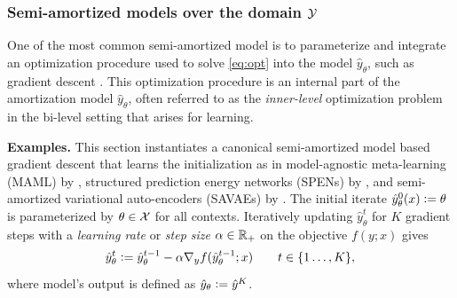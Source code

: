 \subsubsection{Semi-amortized models over the domain ${\mathcal{Y}}$}
\label{sec:semi-domain}
\begin{center}
\end{center}
\vspace{-3mm}

One of the most common semi-amortized model is to
parameterize and integrate an optimization procedure
used to solve \cref{eq:opt} into the model $\hat y_\theta$,
such as gradient descent \citep{andrychowicz2016learning,finn2017model,kim2018semi}.
This optimization procedure is an internal part of
the amortization model $\hat y_\theta$,
often referred to as the \emph{inner-level} optimization
problem in the bi-level setting that arises for learning.

\textbf{Examples.}
This section instantiates a canonical semi-amortized model based
gradient descent that learns the initialization as in
model-agnostic meta-learning (MAML) by \citet{finn2017model},
structured prediction energy networks (SPENs) by \citet{belanger2017end},
and semi-amortized variational auto-encoders (SAVAEs) by \citet{kim2018semi}.
The initial iterate $\hat y^{0}_\theta(x)\vcentcolon= \theta$
is parameterized by $\theta\in{\mathcal{X}}$ for all contexts.
Iteratively updating $\hat y^{t}_\theta$ for $K$ gradient steps
with a \emph{learning rate} or \emph{step size} $\alpha\in\mathbb{R}_+$
on the objective $f(y;x)$ gives
\begin{equation}
  \hat y^{t}_\theta \vcentcolon= \hat y^{t-1}_\theta - \alpha \nabla_y f(\hat y^{t-1}_\theta; x) \qquad t\in\{1\ldots,K\},
  \label{eq:gd}
\end{equation}
where model's output is defined as
$\hat y_\theta\vcentcolon= \hat y^{K}$.


